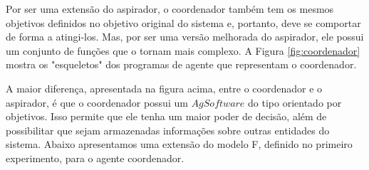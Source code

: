 Por ser uma extensão do aspirador, o coordenador também tem os mesmos objetivos definidos no objetivo original do sistema e, portanto, deve se comportar de forma a atingi-los. Mas, por ser uma versão melhorada do aspirador, ele possui um conjunto de funções que o tornam mais complexo. A Figura \ref{fig:coordenador} mostra os "esqueletos" dos programas de agente que representam o coordenador. 

\begin{figure}[h!]
    \centering
\end{figure}

A maior diferença, apresentada na figura acima, entre o coordenador e o aspirador, é que o coordenador possui um $AgSoftware$ do tipo orientado por objetivos. Isso permite que ele tenha um maior poder de decisão, além de possibilitar que sejam armazenadas informações sobre outras entidades do sistema. Abaixo apresentamos uma extensão do modelo F, definido no primeiro experimento, para o agente coordenador.

